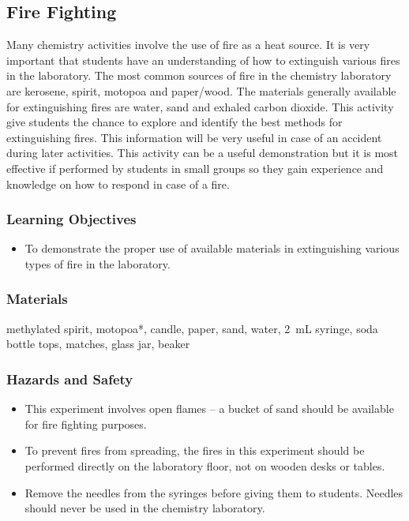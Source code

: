 \subsection{Fire Fighting}
Many chemistry activities involve the use of fire as a heat source. It is very important that students have an understanding of how to extinguish various fires in the laboratory. The most common sources of fire in the chemistry laboratory are kerosene, spirit, motopoa and paper/wood. The materials generally available for extinguishing fires are water, sand and exhaled carbon dioxide. This activity give students the chance to explore and identify the best methods for extinguishing fires. This information will be very useful in case of an accident during later activities. This activity can be a useful demonstration but it is most effective if performed by students in small groups so they gain experience and knowledge on how to respond in case of a fire.
\subsubsection*{Learning Objectives}
\begin{itemize}
\item{To demonstrate the proper use of available materials in extinguishing various types of fire in the laboratory.}
\end{itemize}

\subsubsection*{Materials}
methylated spirit, motopoa*, candle, paper, sand, water, 2~mL syringe, soda bottle tops, matches, glass jar, beaker

\subsubsection*{Hazards and Safety}
\begin{itemize}
\item{This experiment involves open flames -- a bucket of sand should be available for fire fighting purposes.}
\item{To prevent fires from spreading, the fires in this experiment should be performed directly on the laboratory floor, not on wooden desks or tables.}
\item{Remove the needles from the syringes before giving them to students. Needles should never be used in the chemistry laboratory.}
\end{itemize}

